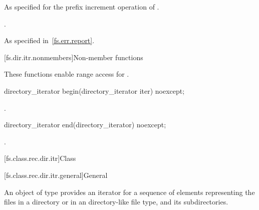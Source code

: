 \begin{itemdescr}
\pnum
\effects
As specified for the prefix increment operation of
.

\pnum
\returns
{}.

\pnum
\throws
As specified in~\ref{fs.err.report}.
\end{itemdescr}

[fs.dir.itr.nonmembers]{Non-member functions}

\pnum
These functions enable range access for .

%
\begin{itemdecl}
directory_iterator begin(directory_iterator iter) noexcept;
\end{itemdecl}

\begin{itemdescr}
\pnum
\returns
{}.
\end{itemdescr}

%
\begin{itemdecl}
directory_iterator end(directory_iterator) noexcept;
\end{itemdecl}

\begin{itemdescr}
\pnum
\returns
{}.
\end{itemdescr}

[fs.class.rec.dir.itr]{Class }

[fs.class.rec.dir.itr.general]{General}

%
\pnum
An object of type  provides an iterator for
a sequence of  elements representing the files in a
directory or in an  directory-like file
type, and its subdirectories.

